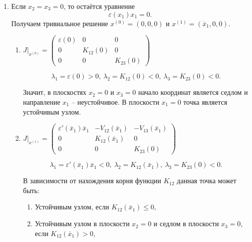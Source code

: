     \begin{enumerate}
        \item Если \( x_2 = x_3 = 0 \), то остаётся уравнение 
        \[ \varepsilon (x_1) x_1 = 0. \] 
        Получаем тривиальное решение \( x^{(0)} = (0,0,0) \) и \( x^{(1)} = (\bar{x}_1, 0, 0) \).
        \begin{enumerate}
            \item \( J \big|_{x^{(0)}} = \left(
                \begin{matrix}
                    \varepsilon(0) & 0 & 0 \\
                    0 & K_{12}(0)  & 0 \\
                    0 & 0 & K_{23} (0)
                \end{matrix}
            \right) \)

            \[
                \lambda_1 = \varepsilon(0) > 0, ~
                \lambda_2 = K_{12} (0) < 0, ~
                \lambda_3 = K_{23} (0) < 0. 
            \]

            Значит, в плоскостях \( x_2 = 0 \) и \( x_3 = 0 \) начало координат является седлом и направление \( x_1 \) -- неустойчивое. В плоскости \( x_1 = 0 \) точка является устойчивым узлом.

            \item \( J \big|_{x^{(1)}} = \left(
                \begin{matrix}
                    \varepsilon'(\bar{x}_1) \bar{x}_1 & -V_{12} (\bar{x}_1) & -V_{13} (\bar{x}_1) \\
                    0 & K_{12}(\bar{x}_1) & 0 \\
                    0 & 0 & K_{23} (0)
                \end{matrix}
            \right) \)

            \[
                \lambda_1 = \varepsilon'(\bar{x}_1) \bar{x}_1 < 0, ~
                \lambda_2 = K_{12} (\bar{x}_1), ~
                \lambda_3 = K_{23} (0) < 0. 
            \]

            В зависимости от нахождения корня функции \( K_{12} \) данная точка может быть:
            \begin{enumerate}
                \item Устойчивым узлом, если \( K_{12} (\bar{x}_1) \leq 0 \),
                \item Устойчивым узлом в плоскости \( x_2 = 0 \) и седлом в плоскости \( x_3 = 0 \), если \( K_{12} (\bar{x}_1) > 0 \),
            \end{enumerate}
            

\end{enumerate}
\end{enumerate}
